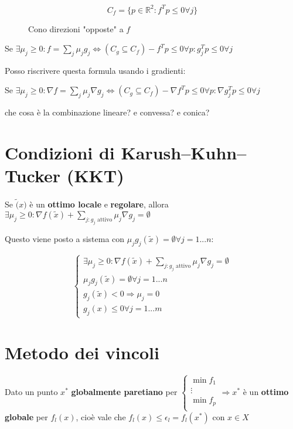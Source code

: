 \documentclass[\main/main.tex]{subfiles}
\begin{document}
\begin{figure}[H]
	\[
		C_f = \{ p \in \mathbb{R}^2: f^T p \leq 0 \forall j \}
	\]
	\caption{Cono direzioni "opposte" a $f$}
\end{figure}

Se $\exists \mu_j \geq 0 : f = \sum_j \mu_j g_j \Leftrightarrow (C_g \subseteq C_f) -f^Tp \leq 0 \forall p: g_j^Tp \leq 0 \forall j$

Posso riscrivere questa formula usando i gradienti:

Se $\exists \mu_j \geq 0 : \nabla f = \sum_j \mu_j \nabla g_j \Leftrightarrow (C_g \subseteq C_f) -\nabla f^Tp \leq 0 \forall p: \nabla g_j^Tp \leq 0 \forall j$

che cosa è la combinazione lineare? e convessa? e conica?

\section{Condizioni di Karush–Kuhn–Tucker (KKT)}

Se $\widetilde(x)$ è un \textbf{ottimo locale} e \textbf{regolare}, allora $\exists \mu_j \geq 0: \nabla f(\widetilde{x}) + \sum_{j:g_j \text{ attivo}} \mu_j \nabla g_j = \emptyset$

Questo viene posto a sistema con $\mu_j g_j (\widetilde{x}) = \emptyset \forall j = 1...n$:

\[
	\begin{cases}
		\exists \mu_j \geq 0: \nabla f(\widetilde{x}) + \sum_{j:g_j \text{ attivo}} \mu_j \nabla g_j = \emptyset \\
		\mu_j g_j (\widetilde{x}) = \emptyset \forall j = 1...n                                                  \\
		g_j(\widetilde{x}) <0 \Rightarrow \mu_j =0                                                               \\
		g_j(x) \leq 0 \forall j = 1...m
	\end{cases}
\]

\section{Metodo dei vincoli}
Dato un punto $x^*$ \textbf{globalmente paretiano} per $\begin{cases}
		\min f_1 \\
		\vdots   \\
		\min f_p \\
	\end{cases} \Rightarrow x^*$ è un \textbf{ottimo globale} per $f_l(x)$, cioè vale che $f_l(x) \leq \epsilon_l = f_l(x^*)$ con $x \in X$
\end{document}
